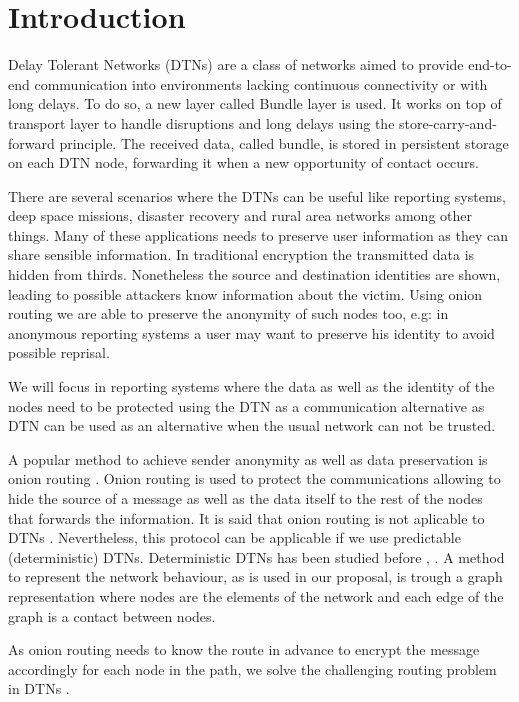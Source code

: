 \section{Introduction}\label{sec:intro}

Delay Tolerant Networks (DTNs) \cite{dtn-definition} are a class of networks aimed to provide end-to-end communication into environments lacking continuous connectivity or with long delays. To do so, a new layer called Bundle layer is used. It works on top of transport layer to handle disruptions and long delays using the store-carry-and-forward principle. The received data, called bundle, is stored in persistent storage on each DTN node, forwarding it when a new opportunity of contact occurs.

There are several scenarios where the DTNs can be useful like reporting systems, deep space missions, disaster recovery and rural area networks among other things. Many of these applications needs to preserve user information as they can share sensible information. In traditional encryption the transmitted data is hidden from thirds.  Nonetheless the source and destination identities are shown, leading to possible attackers know information about the victim. Using onion routing we are able to preserve the anonymity of such nodes too, e.g: in anonymous reporting systems a user may want to preserve his identity to avoid possible reprisal.

We will focus in reporting systems where the data as well as the identity of the nodes need to be protected using the DTN as a communication alternative as DTN can be used as an alternative when the usual network can not be trusted.

A popular method to achieve sender anonymity as well as data preservation is onion routing \cite{onion-routing}. Onion routing is used to protect the communications allowing to hide the source of a message as well as the data itself to the rest of the nodes that forwards the information. It is said that onion routing is not aplicable to DTNs \cite{dtn-security-analysis}. Nevertheless, this protocol can be applicable if we use predictable (deterministic) DTNs. Deterministic DTNs has been studied before \cite{probabilistic-dtn}, \cite{deterministic-dtn}. A method to represent the network behaviour, as is used in our proposal, is trough a graph representation where nodes are the elements of the network and each edge of the graph is a contact between nodes.

As onion routing needs to know the route in advance to encrypt the message accordingly for each node in the path, we solve the challenging routing problem in DTNs \cite{oracle-types}. 

